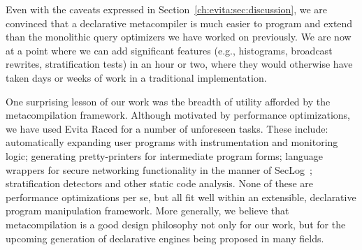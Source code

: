 Even with the caveats expressed in Section~\ref{ch:evita:sec:discussion}, we are convinced that a declarative metacompiler
is much easier to program and extend than the monolithic query optimizers we have worked on previously.
We are now at a  point where we can add significant features (e.g., histograms, broadcast rewrites, 
stratification tests) in an hour or two, where they would otherwise have taken days or weeks of work
in a traditional implementation. 

One surprising lesson of our work was the breadth of utility afforded by the metacompilation framework. Although
motivated by performance optimizations, we have used Evita Raced for a number of unforeseen tasks. These
include: automatically expanding user programs with instrumentation and monitoring logic; generating pretty-printers
for intermediate program forms; language wrappers for secure networking functionality in the manner of
SecLog~\cite{abadi-netdb07}; stratification detectors and other static code analysis. None of these are performance optimizations
per se, but all fit well within an extensible, declarative program manipulation framework. More generally, we believe
that metacompilation is a good design philosophy not only for our work, but for the upcoming generation of
declarative engines being proposed in many fields. 

